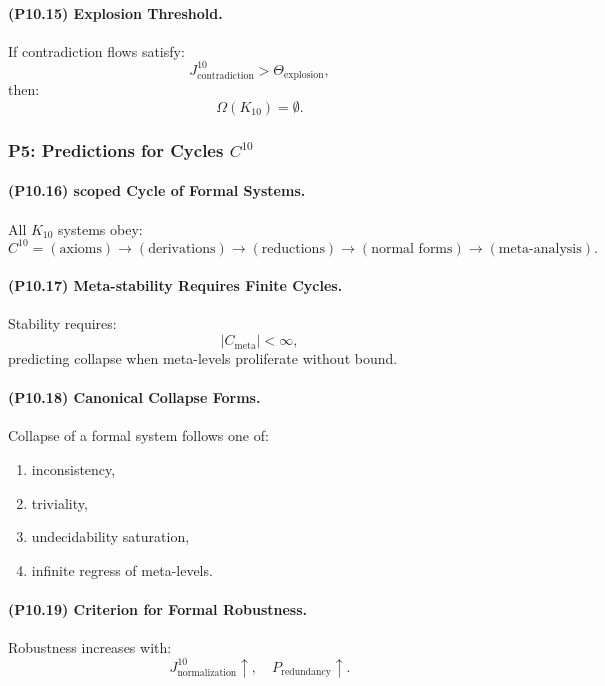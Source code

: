 \paragraph{(P10.15) Explosion Threshold.}
If contradiction flows satisfy:
\[
J_{\mathrm{contradiction}}^{10} > \Theta_{\mathrm{explosion}},
\]
then:
\[
\Omega(K_{10}) = \emptyset.
\]

\subsubsection{P5: Predictions for Cycles $C^{10}$}

\paragraph{(P10.16) scoped Cycle of Formal Systems.}
All $K_{10}$ systems obey:
\[
C^{10} =
(\text{axioms}) \to (\text{derivations}) \to
(\text{reductions}) \to (\text{normal forms}) \to
(\text{meta-analysis}).
\]

\paragraph{(P10.17) Meta-stability Requires Finite Cycles.}
Stability requires:
\[
|C_{\mathrm{meta}}| < \infty,
\]
predicting collapse when meta-levels proliferate without bound.

\paragraph{(P10.18) Canonical Collapse Forms.}
Collapse of a formal system follows one of:
\begin{enumerate}
    \item inconsistency,
    \item triviality,
    \item undecidability saturation,
    \item infinite regress of meta-levels.
\end{enumerate}

\paragraph{(P10.19) Criterion for Formal Robustness.}
Robustness increases with:
\[
J_{\mathrm{normalization}}^{10} \uparrow,
\quad
P_{\mathrm{redundancy}} \uparrow.
\]

